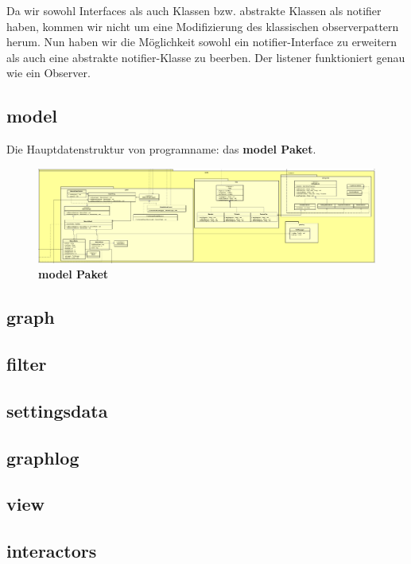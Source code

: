 Da wir sowohl Interfaces als auch Klassen bzw. abstrakte Klassen als
\gls{notifier} haben, kommen wir nicht um eine Modifizierung des klassischen
\gls{observerpattern} herum. Nun haben wir die Möglichkeit sowohl ein
\gls{notifier}-Interface zu erweitern als auch eine abstrakte
\gls{notifier}-Klasse zu beerben. Der \gls{listener} funktioniert genau wie ein
Observer.


\subsection{\textbf{model}}


Die Hauptdatenstruktur von \gls{programname}: das \textbf{model Paket}.

\begin{figure}[H]
  \centering
  \includegraphics[width=\textwidth]{../diagramimages/model.png}
  \caption{\textbf{model Paket}}
\end{figure}

    \subsection*{\textbf{graph}}

    \subsection*{\textbf{filter}}

    \subsection*{\textbf{settingsdata}}

    \subsection*{\textbf{graphlog}}


\subsection{\textbf{view}}


\subsection{\textbf{interactors}}
